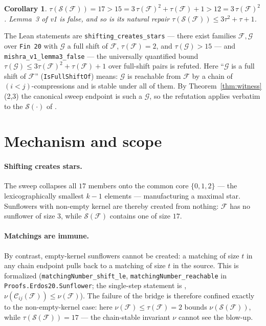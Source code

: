 \documentclass[11pt,a4paper]{article}
\newtheorem{corollary}{Corollary}
\theoremstyle{remark}
\newcommand{\cC}{\mathcal{C}}
\newcommand{\cF}{\mathcal{F}}
\newcommand{\cG}{\mathcal{G}}
\newcommand{\cS}{\mathcal{S}}
\begin{document}
\begin{corollary}\label{cor:false}
$\tau(\cS(\cF))=17>15=3\,\tau(\cF)^{2}+\tau(\cF)+1>12=3\,\tau(\cF)^{2}$.
Lemma~3 of \cite{Mi26}v1 is false, and so is its natural repair
$\tau(\cS(\cF))\le3\tau^{2}+\tau+1$.
\end{corollary}

The Lean statements are
\texttt{shifting\_creates\_stars} --- there exist families
$\cF,\cG$ over \texttt{Fin 20} with $\cG$ a full shift of $\cF$,
$\tau(\cF)=2$, and $\tau(\cG)>15$ --- and
\texttt{mishra\_v1\_lemma3\_false} --- the universally quantified bound
$\tau(\cG)\le3\tau(\cF)^{2}+\tau(\cF)+1$ over full-shift pairs is
refuted. Here ``$\cG$ is a full shift of $\cF$''
(\texttt{IsFullShiftOf}) means: $\cG$ is reachable from $\cF$ by a
chain of $(i<j)$-compressions and is stable under all of them. By
Theorem~\ref{thm:witness}(2,3) the canonical sweep endpoint is such a
$\cG$, so the refutation applies verbatim to the $\cS(\cdot)$ of
\cite{Mi26}.

\section{Mechanism and scope}

\paragraph{Shifting creates stars.}
The sweep collapses all $17$ members onto the common core $\{0,1,2\}$
--- the lexicographically smallest $k-1$ elements --- manufacturing a
maximal star. Sunflowers with non-empty kernel are thereby created
from nothing: $\cF$ has no sunflower of size $3$, while $\cS(\cF)$
contains one of size $17$.

\paragraph{Matchings are immune.}
By contrast, empty-kernel sunflowers cannot be created: a matching of
size $t$ in any chain endpoint pulls back to a matching of size $t$ in
the source. This is formalized
(\texttt{matchingNumber\_shift\_le},
\texttt{matchingNumber\_reachable} in
\texttt{Proofs.Erdos20.Sunflower}; the single-step statement is
\cite[Lemma~1(iii)]{Mi26}, $\nu(\cC_{ij}(\cF))\le\nu(\cF)$). The
failure of the bridge is therefore confined exactly to the
non-empty-kernel case: here $\nu(\cF)\le\tau(\cF)=2$ bounds
$\nu(\cS(\cF))$, while $\tau(\cS(\cF))=17$ --- the chain-stable
invariant $\nu$ cannot see the blow-up.
\end{document}
